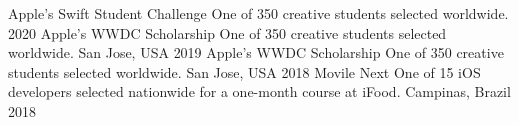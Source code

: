 \begin{cvhonors}
  \cvhonor
    {Apple's Swift Student Challenge}
    {One of 350 creative students selected worldwide.}
    {}
    {2020}
  \cvhonor
    {Apple's WWDC Scholarship}
    {One of 350 creative students selected worldwide.}
    {San Jose, USA}
    {2019}
  \cvhonor
    {Apple's WWDC Scholarship}
    {One of 350 creative students selected worldwide.}
    {San Jose, USA}
    {2018}
  \cvhonor
    {Movile Next}
    {One of 15 iOS developers selected nationwide for a one-month course at iFood.}
    {Campinas, Brazil}
    {2018}
\end{cvhonors}
